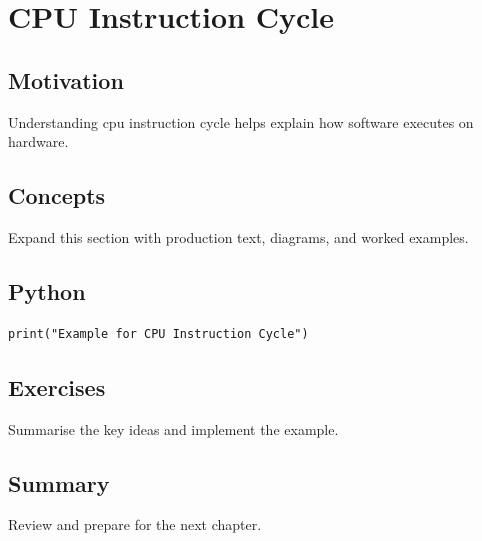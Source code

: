 \chapter{CPU Instruction Cycle}
\label{chap:26}



\section{Motivation}
Understanding cpu instruction cycle helps explain how software executes on hardware.

\section{Concepts}
Expand this section with production text, diagrams, and worked examples.

\section{Python}
\begin{lstlisting}
print("Example for CPU Instruction Cycle")
\end{lstlisting}

\section{Exercises}
\begin{exercise}
Summarise the key ideas and implement the example.
\end{exercise}

\section{Summary}
Review and prepare for the next chapter.
